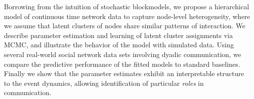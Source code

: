 Borrowing from the intuition of stochastic blockmodels, we propose a hierarchical model of continuous time network data to capture node-level heterogeneity, where we assume that latent clusters of nodes share similar patterns of interaction.
We describe parameter estimation and learning of  latent cluster assignments via MCMC, and illustrate the behavior of the model  with simulated data.
Using several real-world social network data sets involving dyadic communication, we compare the predictive performance of the fitted models to standard baselines.
Finally we show that the parameter estimates exhibit an interpretable structure to the event dynamics, allowing identification of particular \emph{roles} in communication.
